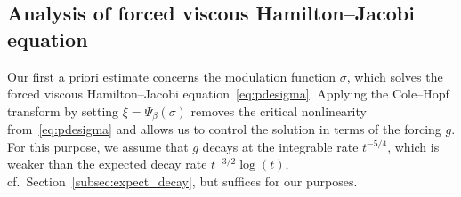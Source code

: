 \documentclass[12pt,oneside,a4paper,reqno]{amsart}
\numberwithin{equation}{section}
\theoremstyle{definition}
\theoremstyle{remark}
\begin{document}
\subsection{Analysis of forced viscous Hamilton--Jacobi equation}

Our first a priori estimate concerns the modulation function $\sigma$, which solves the forced viscous Hamilton--Jacobi equation~\eqref{eq:pdesigma}.
Applying the Cole--Hopf transform by setting $\xi = \Psi_\beta(\sigma)$ removes the critical nonlinearity from~\eqref{eq:pdesigma} and allows us to control the solution in terms of the forcing $g$.  
For this purpose, we assume that $g$ decays at the integrable rate $t^{-5/4}$, which is weaker than the expected decay rate $t^{-3/2}\log(t)$, cf.\ Section~\ref{subsec:expect_decay}, but suffices for our purposes.
\end{document}
